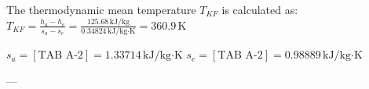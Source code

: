 The thermodynamic mean temperature \( T_{KF} \) is calculated as:  
\( T_{KF} = \frac{h_a - h_e}{s_a - s_e} = \frac{125.68 \, \text{kJ/kg}}{0.34824 \, \text{kJ/kg·K}} = 360.9 \, \text{K} \)  

\( s_a = [\text{TAB A-2}] = 1.33714 \, \text{kJ/kg·K} \)  
\( s_e = [\text{TAB A-2}] = 0.98889 \, \text{kJ/kg·K} \)  

---